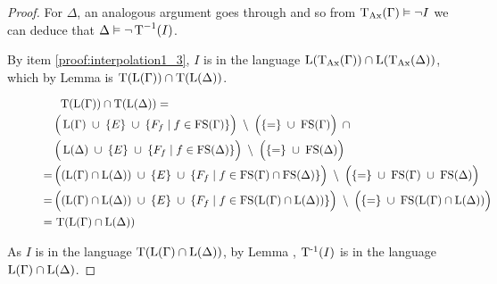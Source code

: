 \begin{proof}
			For $\Delta$, an analogous argument goes through and so from $\operatorname{\operatorname{T}_{Ax}}(\Gamma) \vDash \lnot I$ we can deduce that $\Delta \vDash \lnot \operatorname{T}^{-1}(I)$.

			By item \ref{proof:interpolation1_3}, $I$ is in the language $\operatorname{L}(\operatorname{\operatorname{T}_{Ax}}(\Gamma)) \cap \operatorname{L}(\operatorname{\operatorname{T}_{Ax}}(\Delta))$, which by Lemma  is $\Trans(\Lang(\Gamma)) \cap\nolinebreak \Trans(\Lang(\Delta)) $. 
				\newcommand{\somespace}{\;}
				\newcommand{\impconn}[1]{\somespace#1\somespace}
				\begin{figure}[H]
			\begin{align*}
				\noalign{$\Trans(\Lang(\Gamma))\cap\nolinebreak \Trans(\Lang(\Delta)) =$} 
				& \Big(\Lang(\Gamma)\impconn\cup \{E\}\impconn\cup\{F_f\mid f \in \FS(\Gamma)\}\Big) \impconn\setminus\Big(\{=\nolinebreak \} \impconn\cup \FS(\Gamma)\Big)\,\impconn\cap \\
				& \Big(\Lang(\Delta)\impconn\cup \{E\}\impconn\cup\{F_f\mid f \in \FS(\Delta)\}\Big) \impconn\setminus\Big(\{=\nolinebreak \} \impconn\cup \FS(\Delta)\Big)\\
				=\,& \Big((\Lang(\Gamma) \cap \Lang(\Delta)) \impconn\cup \{E\} \impconn\cup\{F_f\mid f \in \FS(\Gamma)\cap\FS(\Delta)\}\Big)  \impconn\setminus\Big(\{=\} \impconn\cup \FS(\Gamma) \impconn\cup \FS(\Delta)\Big) \\
				=\,& \Big((\Lang(\Gamma) \cap \Lang(\Delta)) \impconn\cup \{E\} \impconn\cup \{F_f\mid f\in \FS( \Lang(\Gamma) \cap \Lang(\Delta))\} \Big) \impconn\setminus \Big( \{=\} \impconn\cup \FS(\Lang(\Gamma) \cap \Lang(\Delta)) \Big)  \\ 
				=\,& \Trans(\Lang(\Gamma) \cap \Lang(\Delta))
			\end{align*}
				\end{figure}
				\vspace{-1em}
			As $I$ is in the language $\operatorname{T}(\operatorname{L}(\Gamma) \cap \operatorname{L}(\Delta))$, by Lemma , $\operatorname{T^{-1}}(I)$ is in the language $\operatorname{L}(\Gamma) \cap \operatorname{L}(\Delta)$.
		\end{proof}


